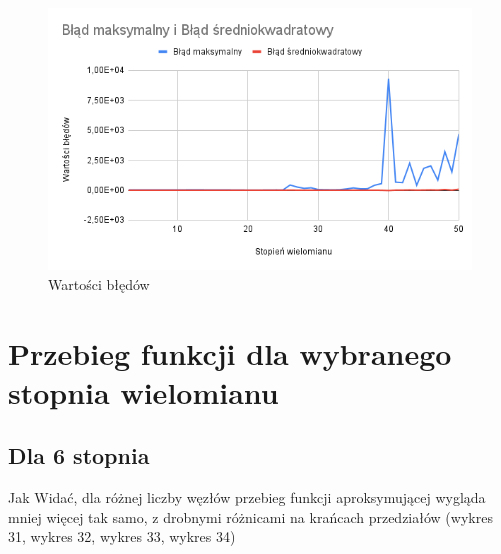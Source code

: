 \documentclass{article}
\begin{document}
\begin{figure}[H]
  \centering
  \begin{minipage}[b]{0.4\textwidth}
    \includegraphics[width=\textwidth]{img30.png}
    \caption{Wartości błędów}
  \end{minipage}
\end{figure}

\newpage

\section{Przebieg funkcji dla wybranego stopnia wielomianu}

\subsection{Dla 6 stopnia}

Jak Widać, dla różnej liczby węzłów przebieg funkcji aproksymującej wygląda mniej więcej tak samo, z drobnymi różnicami na krańcach przedziałów (wykres 31, wykres 32, wykres 33, wykres 34)
\end{document}
